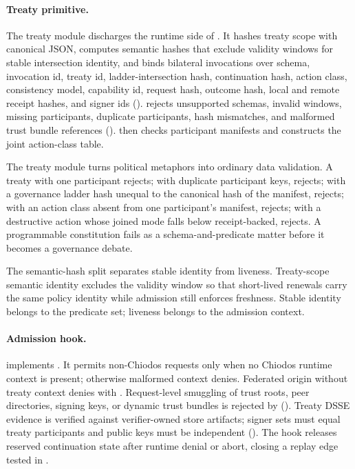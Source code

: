\paragraph{Treaty primitive.}
The treaty module  discharges the runtime side of . It hashes treaty scope with canonical JSON, computes semantic hashes that exclude validity windows for stable intersection identity, and binds bilateral invocations over schema, invocation id, treaty id, ladder-intersection hash, continuation hash, action class, consistency model, capability id, request hash, outcome hash, local and remote receipt hashes, and signer ids ().  rejects unsupported schemas, invalid windows, missing participants, duplicate participants, hash mismatches, and malformed trust bundle references ().  then checks participant manifests and constructs the joint action-class table.

The treaty module turns political metaphors into ordinary data validation. A treaty with one participant rejects; with duplicate participant keys, rejects; with a governance ladder hash unequal to the canonical hash of the manifest, rejects; with an action class absent from one participant's manifest, rejects; with a destructive action whose joined mode falls below receipt-backed, rejects. A programmable constitution fails as a schema-and-predicate matter before it becomes a governance debate.

The semantic-hash split separates stable identity from liveness. Treaty-scope semantic identity excludes the validity window so that short-lived renewals carry the same policy identity while admission still enforces freshness. Stable identity belongs to the predicate set; liveness belongs to the admission context.

\paragraph{Admission hook.}
 implements . It permits non-Chiodos requests only when no Chiodos runtime context is present; otherwise malformed context denies. Federated origin without treaty context denies with . Request-level smuggling of trust roots, peer directories, signing keys, or dynamic trust bundles is rejected by  (). Treaty DSSE evidence is verified against verifier-owned store artifacts; signer sets must equal treaty participants and public keys must be independent (). The hook releases reserved continuation state after runtime denial or abort, closing a replay edge tested in .

